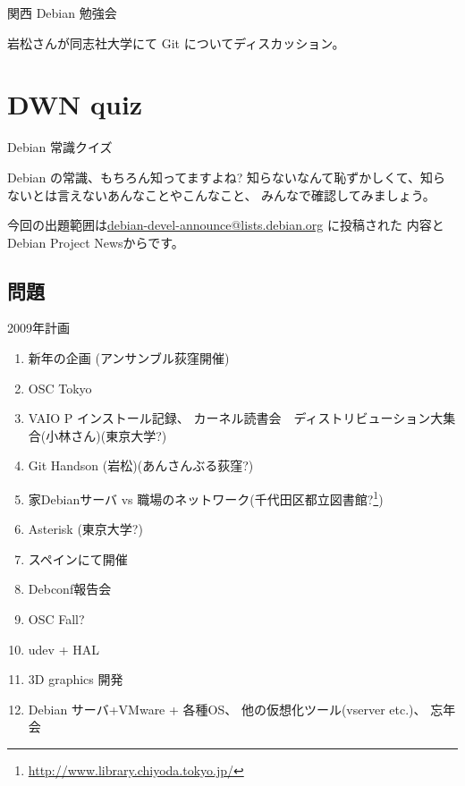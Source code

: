 \begin{frame}{関西 Debian 勉強会}

岩松さんが同志社大学にて Git についてディスカッション。

\end{frame}

\section{DWN quiz}
\begin{frame}{Debian 常識クイズ}

Debian の常識、もちろん知ってますよね?
知らないなんて恥ずかしくて、知らないとは言えないあんなことやこんなこと、
みんなで確認してみましょう。

今回の出題範囲は\url{debian-devel-announce@lists.debian.org} に投稿された
内容とDebian Project Newsからです。

\end{frame}

\subsection{問題}


\begin{frame}{2009年計画}

{\scriptsize
 \begin{enumerate}
  \item 新年の企画 (アンサンブル荻窪開催)
  \item OSC Tokyo
  \item VAIO P インストール記録、
	カーネル読書会　ディストリビューション大集合(小林さん)(東京大学?)
  \item Git Handson (岩松)(あんさんぶる荻窪?)
  \item 家Debianサーバ vs 職場のネットワーク(千代田区都立図書館?\footnote{\url{http://www.library.chiyoda.tokyo.jp/}})
  \item Asterisk (東京大学?)
  \item スペインにて開催
  \item Debconf報告会
  \item OSC Fall?
  \item udev + HAL
  \item 3D graphics 開発 
  \item Debian サーバ+VMware + 各種OS、
	他の仮想化ツール(vserver etc.)、
	忘年会
 \end{enumerate}
}
\end{frame}

